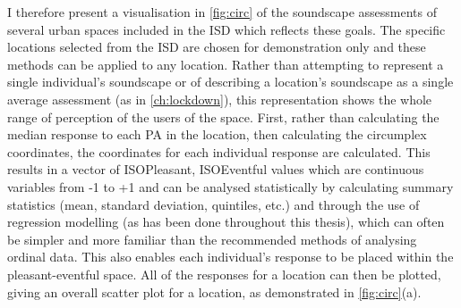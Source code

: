 I therefore present a visualisation in \cref{fig:circ} of the soundscape assessments of several urban spaces included in the ISD which reflects these goals. The specific locations selected from the ISD are chosen for demonstration only and these methods can be applied to any location. Rather than attempting to represent a single individual's soundscape or of describing a location's soundscape as a single average assessment (as in \cref{ch:lockdown}), this representation shows the whole range of perception of the users of the space. First, rather than calculating the median response to each PA in the location, then calculating the circumplex coordinates, the coordinates for each individual response are calculated. This results in a vector of ISOPleasant, ISOEventful values which are continuous variables from -1 to +1 and can be analysed statistically by calculating summary statistics (mean, standard deviation, quintiles, etc.) and through the use of regression modelling (as has been done throughout this thesis), which can often be simpler and more familiar than the recommended methods of analysing ordinal data. This also enables each individual's response to be placed within the pleasant-eventful space. All of the responses for a location can then be plotted, giving an overall scatter plot for a location, as demonstrated in \cref{fig:circ}(a).


